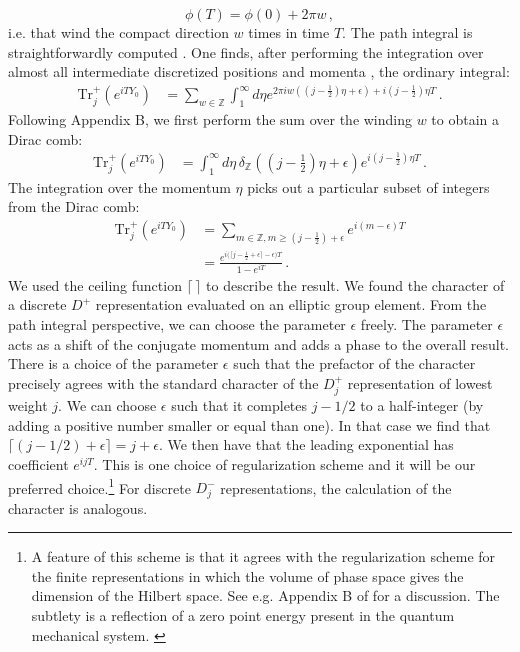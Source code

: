 \documentclass[12pt]{article}
\numberwithin{equation}{section}
\numberwithin{equation}{section}
\numberwithin{table}{section}\setlength{\multlinegap}{25pt}
\begin{document}
\begin{equation}
\phi(T)=\phi(0) + 2 \pi w \, ,
\end{equation}
i.e. that wind the compact direction $w$ times in time $T$. 
The path integral is straightforwardly  computed \cite{Alekseev:1988vx}. One finds, after  performing the integration over almost all intermediate discretized positions and momenta \cite{Alekseev:1988vx}, the ordinary integral:
\begin{align}
\text{Tr}_j^+ \left( e^{ i T Y_0} \right) &= \sum_{w \in \mathbb{Z}} %
\int_{1}^{\infty} d \eta e^{2 \pi i w ( (j-\frac{1}{2}) \eta+\epsilon) + i   (j-\frac{1}{2}) \eta T}  \, .
\end{align}
Following  \cite{Troost:2003ge} Appendix B, we first perform the sum over the winding $w$ to obtain a Dirac comb:
\begin{align}
\text{Tr}_j^+ \left( e^{ iT Y_0} \right) &= \int_{1}^\infty d \eta \,  \delta_{\mathbb{Z}} ((j-\frac{1}{2}) \eta + \epsilon)
e^{ i   (j-\frac{1}{2}) \eta T}  \, .
\end{align}
The integration over the momentum $\eta$ picks out a particular subset of integers from the Dirac comb:
\begin{align}
\text{Tr}_j^+ \left( e^{ iT Y_0} \right) &= \sum_{m \in \mathbb{Z}, m \ge (j-\frac{1}{2})+\epsilon }
e^{ i   (m-\epsilon)  T}
\nonumber  \\
&= 
\frac{e^{ i \big(\lceil j-\frac{1}{2}+\epsilon\rceil-\epsilon \big)   T}}{1-e^{ i   T}} \, .
\end{align}
We used the ceiling function $\lceil{}\, \rceil$ to describe the result. We found the character of a discrete $D^{+}$ representation evaluated on an elliptic group element. From the path integral perspective, we can choose the parameter $\epsilon$ freely. The parameter $\epsilon$  acts as a shift of the conjugate momentum  and adds a phase to the overall result.  There is a choice of  the parameter $\epsilon$ such that the prefactor of the character precisely agrees with the standard character of the  $D^+_j$ representation of lowest weight $j$. We can choose $\epsilon$ such that it completes $j-1/2$ to a half-integer (by adding a  positive number smaller or equal than one). In that case we  find that $\lceil (j-1/2)+\epsilon \rceil=j+\epsilon$.  We  then have that the leading exponential has coefficient $e^{ i j   T}$. This is one choice of regularization scheme and it will be our preferred choice.\footnote{A feature of this scheme is that it agrees  with the regularization scheme for the finite representations in which the volume of phase space gives the dimension of the Hilbert space. See e.g. Appendix B of \cite{Troost:2003ge} for a discussion. The subtlety is a reflection of a zero point energy present in the quantum mechanical system. \label{VolumeFootnote}
} For discrete $D^-_j$ representations, the calculation of the character is analogous. 
\end{document}
